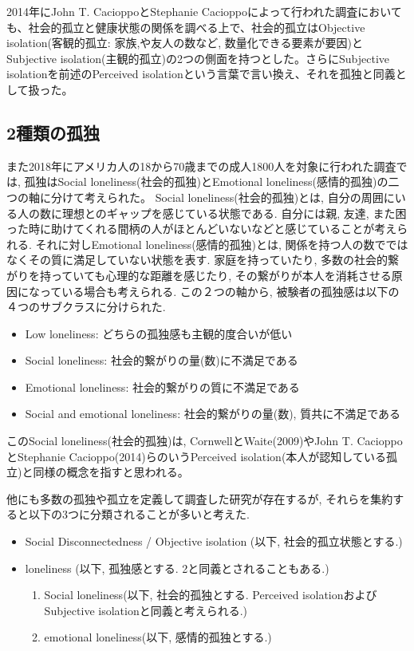 \documentclass[a4paper,dvipdfmx]{hisken}
\begin{document}
2014年にJohn T. CacioppoとStephanie Cacioppoによって行われた調査においても、社会的孤立と健康状態の関係を調べる上で、社会的孤立はObjective isolation(客観的孤立: 家族,や友人の数など, 数量化できる要素が要因)とSubjective isolation(主観的孤立)の2つの側面を持つとした{}\cite{tex2}。さらにSubjective isolationを前述のPerceived isolationという言葉で言い換え、それを孤独と同義として扱った。

\subsection{2種類の孤独}

また2018年にアメリカ人の18から70歳までの成人1800人を対象に行われた調査では, 孤独はSocial loneliness(社会的孤独)とEmotional loneliness(感情的孤独)の二つの軸に分けて考えられた{}\cite{tex3}。
Social loneliness(社会的孤独)とは, 自分の周囲にいる人の数に理想とのギャップを感じている状態である. 自分には親, 友達, また困った時に助けてくれる間柄の人がほとんどいないなどと感じていることが考えられる. それに対しEmotional loneliness(感情的孤独)とは, 関係を持つ人の数でではなくその質に満足していない状態を表す. 家庭を持っていたり, 多数の社会的繋がりを持っていても心理的な距離を感じたり, その繋がりが本人を消耗させる原因になっている場合も考えられる. 
この２つの軸から, 被験者の孤独感は以下の４つのサブクラスに分けられた. 
\begin{itemize}
\item Low loneliness: どちらの孤独感も主観的度合いが低い
\item Social loneliness: 社会的繋がりの量(数)に不満足である
\item Emotional loneliness:  社会的繋がりの質に不満足である
\item Social and emotional loneliness: 社会的繋がりの量(数), 質共に不満足である
\end{itemize}


このSocial loneliness(社会的孤独)は, CornwellとWaite(2009)やJohn T. CacioppoとStephanie Cacioppo(2014)らのいうPerceived isolation(本人が認知している孤立)と同様の概念を指すと思われる。

他にも多数の孤独や孤立を定義して調査した研究が存在するが, それらを集約すると以下の3つに分類されることが多いと考えた.
\begin{itemize}
\item Social Disconnectedness / Objective isolation (以下, 社会的孤立状態とする.)
\item loneliness (以下, 孤独感とする. 2と同義とされることもある.)
\begin{enumerate}
\item Social loneliness(以下, 社会的孤独とする. Perceived isolationおよびSubjective isolationと同義と考えられる.)
\item emotional loneliness(以下, 感情的孤独とする.)
\end{enumerate}
\end{itemize}
\end{document}
